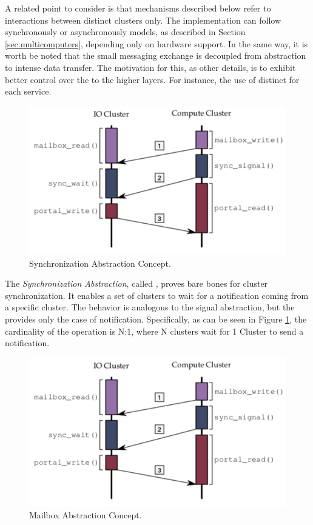 	        		A related point to consider is that mechanisms described below refer
	        		to interactions between distinct clusters only.
		        	The implementation can follow synchronously or asynchronously models,
		        	as described in Section \ref{sec.multicomputers}, depending only on hardware support.
		        	In the same way, it is worth be noted that the small messaging exchange
		        	is decoupled from abstraction to intense data transfer.
		        	The motivation for this, as other details, is to exhibit better control
		        	over the \qos to the higher layers.
		        	For instance, the use of distinct \nocs for each service.

			\label{sec.sync-abs}

				\begin{figure}[h]
					\centering
					\includegraphics[width=.7\textwidth]{images/conceptual-sync.png}
					\caption{
						Synchronization Abstraction Concept.
					}\par
					\label{fig.conpt_sync}
				\end{figure}

				The \textit{Synchronization Abstraction}, called \sync, proves bare bones
				for cluster synchronization.
				It enables a set of clusters to wait for a notification coming from a
				specific cluster.
				The behavior is analogous to the \posix signal abstraction, but the \sync
				provides only the case of notification.
				Specifically, as can be seen in Figure \ref{fig.conpt_sync}, the
				cardinality of the operation is N:1, where N clusters wait for 1 Cluster
				to send a notification.

			\label{sec.mailbox-abs}

				\begin{figure}[h]
					\centering
					\includegraphics[width=.7\textwidth]{images/conceptual-sync.png}
					\caption{
						Mailbox Abstraction Concept.
					}\par
					\label{fig.conpt_mailbox}
				\end{figure}

